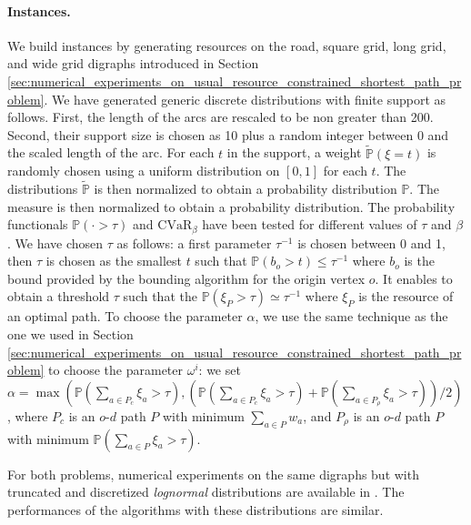 \documentclass[11pt]{amsart}
\theoremstyle{plain}
\theoremstyle{remark}
\def\P{\mathbb{P}}
\newcommand{\rmeas}{\rho}
\newcommand{\cvar}{\mathrm{CVaR}}
\begin{document}
\paragraph{Instances.} We build instances by generating resources on the road, square grid, long grid, and wide grid digraphs introduced in Section \ref{sec:numerical_experiments_on_usual_resource_constrained_shortest_path_problem}. We have generated generic discrete distributions with finite support as follows. First, the length of the arcs are rescaled to be non greater than 200. Second, their support size is chosen as 10 plus a random integer between 0 and the scaled length of the arc. For each $t$ in the support, a weight $\tilde{\P}(\xi = t)$ is randomly chosen using a uniform distribution on $[0,1]$ for each $t$. The distributions $\tilde{\P}$ is then normalized to obtain a probability distribution $\P$. The measure is then normalized to obtain a probability distribution. The probability functionals $\P(\cdot>\tau)$ and $\cvar_{\beta}$ have been tested for different values of $\tau$ and $\beta$. We have chosen $\tau$ as follows: a first parameter $\tau^{-1}$ is chosen between 0 and 1, then $\tau$ is chosen as the smallest $t$ such that $\P(b_{o}>t) \leq \tau^{-1}$ where $b_{o}$ is the bound provided by the bounding algorithm for the origin vertex $o$. It enables to obtain a threshold $\tau$ such that the $\P(\xi_{P} > \tau) \simeq \tau^{-1}$ where $\xi_{P}$ is the resource of an optimal path. To choose the parameter $\alpha$, we use the same technique as the one we used in Section \ref{sec:numerical_experiments_on_usual_resource_constrained_shortest_path_problem} to choose the parameter $\omega^{i}$: we set $\alpha = \max\left(\P\left(\sum_{a \in P_{c}}\xi_{a} > \tau\right), \left(\P\left(\sum_{a \in P_{c}}\xi_{a} > \tau\right) + \P(\sum_{a \in P_{\rmeas}}\xi_{a} > \tau)\right)/2\right)$, where $P_{c}$ is an $o$-$d$ path $P$ with minimum $\sum_{a \in P}w_{a}$, and $P_{\rmeas}$ is an $o$-$d$ path $P$ with minimum $\P\left(\sum_{a \in P}\xi_{a} > \tau\right)$. 

For both problems, numerical experiments on the same digraphs but with truncated and discretized \emph{lognormal} distributions are available in \cite{parmentier2016thesis}. The performances of the algorithms with these distributions are similar.
\end{document}
